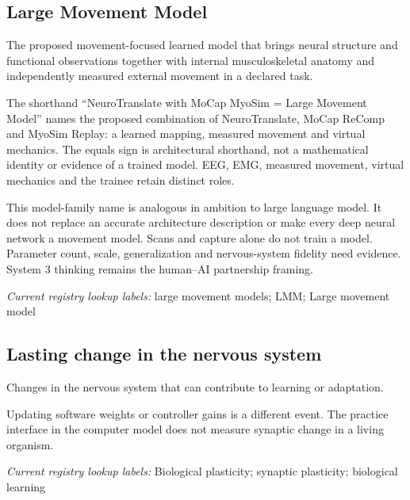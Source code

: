 \subsection*{Large Movement Model}
\noindent The proposed movement-focused learned model that brings neural structure and functional observations together with internal musculoskeletal anatomy and independently measured external movement in a declared task.\par
\noindent The shorthand “NeuroTranslate with MoCap MyoSim = Large Movement Model” names the proposed combination of NeuroTranslate, MoCap ReComp and MyoSim Replay: a learned mapping, measured movement and virtual mechanics. The equals sign is architectural shorthand, not a mathematical identity or evidence of a trained model. EEG, EMG, measured movement, virtual mechanics and the trainee retain distinct roles.\par
\noindent This model-family name is analogous in ambition to large language model. It does not replace an accurate architecture description or make every deep neural network a movement model. Scans and capture alone do not train a model. Parameter count, scale, generalization and nervous-system fidelity need evidence. System 3 thinking remains the human–AI partnership framing.\par

\noindent\textit{Current registry lookup labels:} large movement models; LMM; Large movement model\par

\begin{samepage}
\subsection*{Lasting change in the nervous system}
\noindent Changes in the nervous system that can contribute to learning or adaptation.\par
\end{samepage}
\begin{samepage}
\noindent Updating software weights or controller gains is a different event. The practice interface in the computer model does not measure synaptic change in a living organism.\par\nopagebreak[4]

\end{samepage}


\noindent\textit{Current registry lookup labels:} Biological plasticity; synaptic plasticity; biological learning\par

